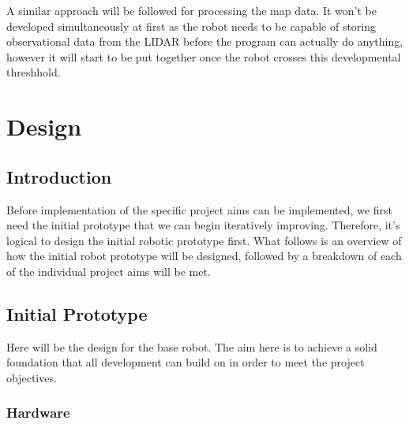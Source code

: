 		A similar approach will be followed for processing the map data. It won't be developed simultaneously at first as the robot needs to be capable of storing observational data from the LIDAR before the program can actually do anything, however it will start to be put together once the robot crosses this developmental threshhold.
	
	\chapter{Design}
		\section{Introduction}
		Before implementation of the specific project aims can be implemented, we first need the initial prototype that we can begin iteratively improving. Therefore, it's logical to design the initial robotic prototype first. What follows is an overview of how the initial robot prototype will be designed, followed by a breakdown of each of the individual project aims will be met.
	
		\section{Initial Prototype}
		Here will be the design for the base robot. The aim here is to achieve a solid foundation that all development can build on in order to meet the project objectives.
			\subsection{Hardware}
